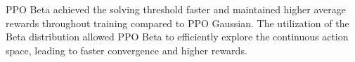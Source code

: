 PPO Beta achieved the solving threshold faster and maintained higher average rewards throughout training compared to PPO Gaussian.
The utilization of the Beta distribution allowed PPO Beta to efficiently explore the continuous action space, leading to faster convergence and higher rewards.



